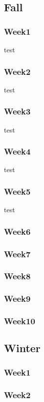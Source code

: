 \subsection*{Fall}
\subsubsection*{Week1}
test
\subsubsection*{Week2}
test
\subsubsection*{Week3}
test
\subsubsection*{Week4}
test
\subsubsection*{Week5}
test
\subsubsection*{Week6}
\subsubsection*{Week7}
\subsubsection*{Week8}
\subsubsection*{Week9}
\subsubsection*{Week10}

\subsection*{Winter}
\subsubsection*{Week1}
\subsubsection*{Week2}
